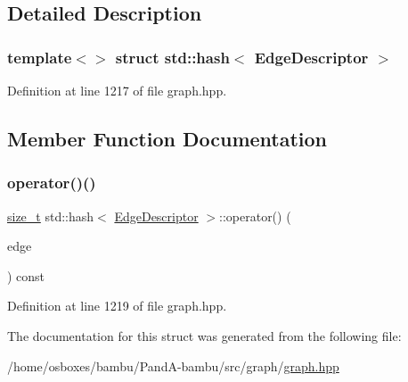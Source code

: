 \subsection{Detailed Description}
\subsubsection*{template$<$$>$\newline
struct std\+::hash$<$ Edge\+Descriptor $>$}



Definition at line 1217 of file graph.\+hpp.



\subsection{Member Function Documentation}
\mbox{\label{structstd_1_1hash_3_01EdgeDescriptor_01_4_a1cc49e948ec1f4155487e2e29b5506eb}} 
\subsubsection{\texorpdfstring{operator()()}{operator()()}}
{\footnotesize\ttfamily \hyperlink{tutorial__fpt__2017_2intro_2sixth_2test_8c_a7c94ea6f8948649f8d181ae55911eeaf}{size\+\_\+t} std\+::hash$<$ \hyperlink{graph_8hpp_a9eb9afea34e09f484b21f2efd263dd48}{Edge\+Descriptor} $>$\+::operator() (\begin{DoxyParamCaption}\item[{\hyperlink{graph_8hpp_a9eb9afea34e09f484b21f2efd263dd48}{Edge\+Descriptor}}]{edge }\end{DoxyParamCaption}) const\hspace{0.3cm}{\ttfamily [inline]}}



Definition at line 1219 of file graph.\+hpp.



The documentation for this struct was generated from the following file\+:\begin{DoxyCompactItemize}
\item 
/home/osboxes/bambu/\+Pand\+A-\/bambu/src/graph/\hyperlink{graph_8hpp}{graph.\+hpp}\end{DoxyCompactItemize}
